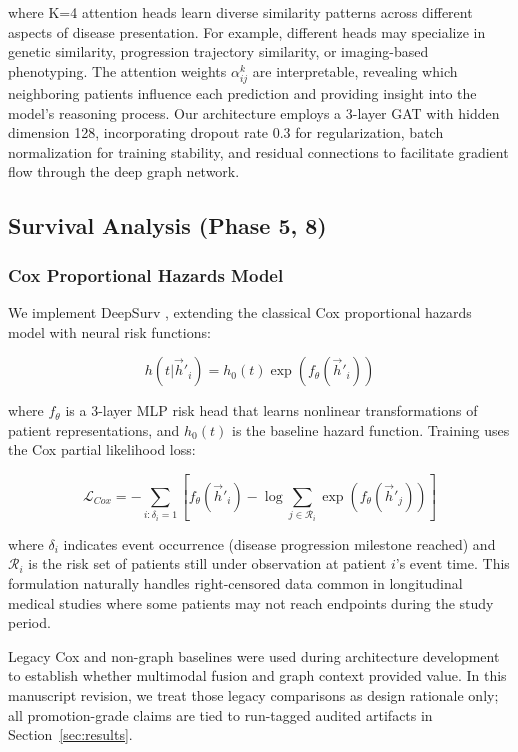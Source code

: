 \documentclass[journal,twoside,web]{ieeecolor}
\begin{document}
where K=4 attention heads learn diverse similarity patterns across different aspects of disease presentation. For example, different heads may specialize in genetic similarity, progression trajectory similarity, or imaging-based phenotyping. The attention weights $\alpha_{ij}^k$ are interpretable, revealing which neighboring patients influence each prediction and providing insight into the model's reasoning process. Our architecture employs a 3-layer GAT with hidden dimension 128, incorporating dropout rate 0.3 for regularization, batch normalization for training stability, and residual connections to facilitate gradient flow through the deep graph network.

\subsection{Survival Analysis (Phase 5, 8)}

\subsubsection{Cox Proportional Hazards Model}
We implement DeepSurv \cite{katzman2018deepsurv}, extending the classical Cox proportional hazards model with neural risk functions:

\begin{equation}
h(t|\vec{h}'_i) = h_0(t) \exp(f_\theta(\vec{h}'_i))
\end{equation}

where $f_\theta$ is a 3-layer MLP risk head that learns nonlinear transformations of patient representations, and $h_0(t)$ is the baseline hazard function. Training uses the Cox partial likelihood loss:

\begin{equation}
\mathcal{L}_{Cox} = -\sum_{i: \delta_i=1} \left[f_\theta(\vec{h}'_i) - \log\sum_{j \in \mathcal{R}_i} \exp(f_\theta(\vec{h}'_j))\right]
\end{equation}

where $\delta_i$ indicates event occurrence (disease progression milestone reached) and $\mathcal{R}_i$ is the risk set of patients still under observation at patient $i$'s event time. This formulation naturally handles right-censored data common in longitudinal medical studies where some patients may not reach endpoints during the study period.

Legacy Cox and non-graph baselines were used during architecture development to establish whether multimodal fusion and graph context provided value. In this manuscript revision, we treat those legacy comparisons as design rationale only; all promotion-grade claims are tied to run-tagged audited artifacts in Section~\ref{sec:results}.
\end{document}
